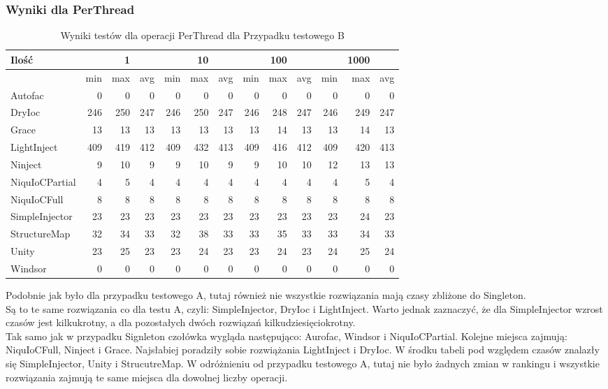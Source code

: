 \documentclass[12pt]{article}
\begin{document}
\subsubsection{Wyniki dla PerThread}
\begin{table}[H]
\captionsetup{belowskip=0pt,aboveskip=0pt}
\begin{center}
\begin{small}
	\begin{tabular}{ | l | r r r | r r r | r r r | r r r | }
    		\hline
Ilość & & 1 & & & 10 & & & 100 & & & 1000 & \\ \hline
 & min & max & avg & min & max & avg & min & max & avg & min & max & avg \\ \hline
Autofac & 0 & 0 & 0 & 0 & 0 & 0 & 0 & 0 & 0 & 0 & 0 & 0 \\ \hline
DryIoc & 246 & 250 & 247 & 246 & 250 & 247 & 246 & 248 & 247 & 246 & 249 & 247 \\ \hline
Grace & 13 & 13 & 13 & 13 & 13 & 13 & 13 & 14 & 13 & 13 & 14 & 13 \\ \hline
LightInject & 409 & 419 & 412 & 409 & 432 & 413 & 409 & 416 & 412 & 409 & 420 & 413 \\ \hline
Ninject & 9 & 10 & 9 & 9 & 10 & 9 & 9 & 10 & 10 & 12 & 13 & 13 \\ \hline
NiquIoCPartial & 4 & 5 & 4 & 4 & 4 & 4 & 4 & 4 & 4 & 4 & 5 & 4 \\ \hline
NiquIoCFull & 8 & 8 & 8 & 8 & 8 & 8 & 8 & 8 & 8 & 8 & 8 & 8 \\ \hline
SimpleInjector & 23 & 23 & 23 & 23 & 23 & 23 & 23 & 23 & 23 & 23 & 24 & 23 \\ \hline
StructureMap & 32 & 34 & 33 & 32 & 38 & 33 & 33 & 35 & 33 & 33 & 34 & 33 \\ \hline
Unity & 23 & 25 & 23 & 23 & 24 & 23 & 23 & 24 & 23 & 24 & 25 & 24 \\ \hline
Windsor & 0 & 0 & 0 & 0 & 0 & 0 & 0 & 0 & 0 & 0 & 0 & 0 \\ \hline
  	\end{tabular}
\end{small}
\end{center}
\caption{Wyniki testów dla operacji PerThread dla Przypadku testowego B}
\label{TestCaseB_PerThread}
\end{table}
Podobnie jak było dla przypadku testowego A, tutaj również nie wszystkie rozwiązania mają czasy zbliżone do Singleton.\\
Są to te same rozwiązania co dla testu A, czyli: SimpleInjector, DryIoc i LightInject. Warto jednak zaznaczyć, że dla SimpleInjector wzrost czasów jest kilkukrotny, a dla pozostałych dwóch rozwiązań kilkudziesięciokrotny.\\
Tak samo jak w przypadku Signleton czołówka wygląda następująco: Aurofac, Windsor i NiquIoCPartial. Kolejne miejsca zajmują: NiquIoCFull, Ninject i Grace. Najsłabiej poradziły sobie rozwiążania LightInject i DryIoc. W środku tabeli pod względem czasów znalazły się SimpleInjector, Unity i StrucutreMap. W odróżnieniu od przypadku testowego A, tutaj nie było żadnych zmian w rankingu i wszystkie rozwiązania zajmują te same miejsca dla dowolnej liczby operacji.
\end{document}
